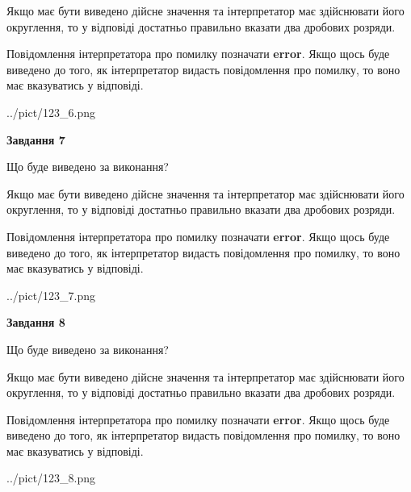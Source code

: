 \documentclass[12pt, ukrainian]{article}
\begin{document}
{\begin {Large}
Якщо має бути виведено дійсне значення та інтерпретатор має здійснювати його округлення, 
то у відповіді достатньо правильно вказати два дробових розряди.

Повідомлення інтерпретатора про помилку позначати \textbf{error}.
Якщо щось буде виведено до того, як інтерпретатор видасть повідомлення про помилку, 
то воно має вказуватись у відповіді. \par

\begin{center}
	{../pict/123_6.png}
\end{center}
\newpage

{\begin {center}\textbf{Завдання 7}\end {center}}\par
Що буде виведено за виконання? \par

Якщо має бути виведено дійсне значення та інтерпретатор має здійснювати його округлення, 
то у відповіді достатньо правильно вказати два дробових розряди.

Повідомлення інтерпретатора про помилку позначати \textbf{error}.
Якщо щось буде виведено до того, як інтерпретатор видасть повідомлення про помилку, 
то воно має вказуватись у відповіді. \par

\begin{center}
	{../pict/123_7.png}
\end{center}
\newpage

{\begin {center}\textbf{Завдання 8}\end {center}}\par
Що буде виведено за виконання? \par

Якщо має бути виведено дійсне значення та інтерпретатор має здійснювати його округлення, 
то у відповіді достатньо правильно вказати два дробових розряди.

Повідомлення інтерпретатора про помилку позначати \textbf{error}.
Якщо щось буде виведено до того, як інтерпретатор видасть повідомлення про помилку, 
то воно має вказуватись у відповіді. \par

\begin{center}
	{../pict/123_8.png}
\end{center}
\newpage


\end{Large}}
\end{document}
